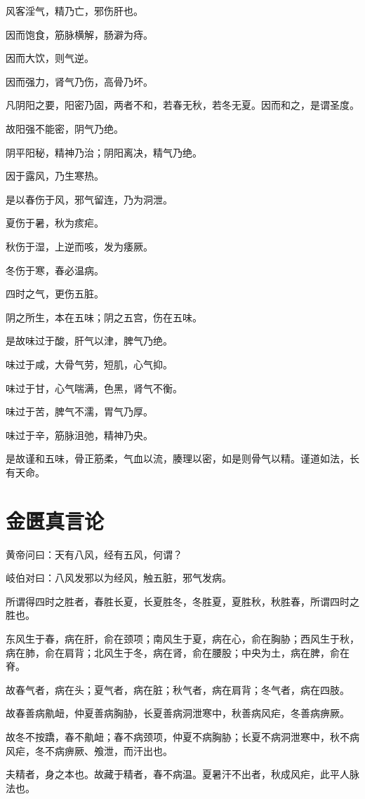 \documentclass{article}%
\begin{document}
风客淫气，精乃亡，邪伤肝也。

因而饱食，筋脉横解，肠澼为痔。

因而大饮，则气逆。

因而强力，肾气乃伤，高骨乃坏。

凡阴阳之要，阳密乃固，两者不和，若春无秋，若冬无夏。因而和之，是谓圣度。

故阳强不能密，阴气乃绝。

阴平阳秘，精神乃治；阴阳离决，精气乃绝。

因于露风，乃生寒热。

是以春伤于风，邪气留连，乃为洞泄。

夏伤于暑，秋为痎疟。

秋伤于湿，上逆而咳，发为痿厥。

冬伤于寒，春必温病。

四时之气，更伤五脏。

阴之所生，本在五味；阴之五宫，伤在五味。

是故味过于酸，肝气以津，脾气乃绝。

味过于咸，大骨气劳，短肌，心气抑。

味过于甘，心气喘满，色黑，肾气不衡。

味过于苦，脾气不濡，胃气乃厚。

味过于辛，筋脉沮弛，精神乃央。

是故谨和五味，骨正筋柔，气血以流，腠理以密，如是则骨气以精。谨道如法，长有天命。
\section{金匮真言论}
黄帝问曰：天有八风，经有五风，何谓？

岐伯对曰：八风发邪以为经风，触五脏，邪气发病。

所谓得四时之胜者，春胜长夏，长夏胜冬，冬胜夏，夏胜秋，秋胜春，所谓四时之胜也。

东风生于春，病在肝，俞在颈项；南风生于夏，病在心，俞在胸胁；西风生于秋，病在肺，俞在肩背；北风生于冬，病在肾，俞在腰股；中央为土，病在脾，俞在脊。

故春气者，病在头；夏气者，病在脏；秋气者，病在肩背；冬气者，病在四肢。

故春善病鼽衄，仲夏善病胸胁，长夏善病洞泄寒中，秋善病风疟，冬善病痹厥。

故冬不按蹻，春不鼽衄；春不病颈项，仲夏不病胸胁；长夏不病洞泄寒中，秋不病风疟，冬不病痹厥、飧泄，而汗出也。

夫精者，身之本也。故藏于精者，春不病温。夏暑汗不出者，秋成风疟，此平人脉法也。
\end{document}
